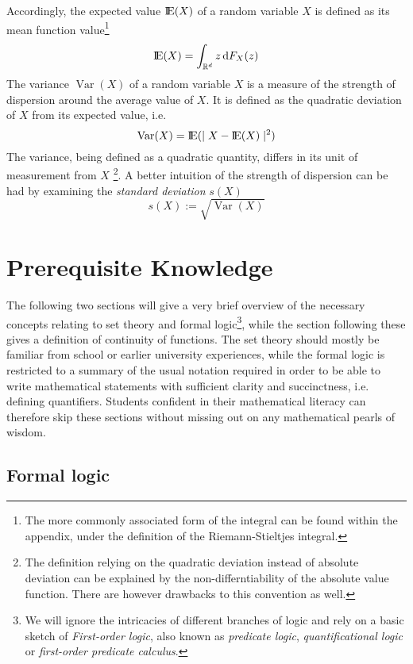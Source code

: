\documentclass[12pt]{article}
\newcommand*\diff{\mathop{}\!\mathrm{d}}
\newcommand{\E}{\mbox{I\negthinspace E}}
\DeclareMathOperator{\Var}{Var}
\begin{document}
Accordingly, the expected value $\E (X)$ of a random variable $X$ is defined as its mean function value\footnote{The more commonly associated form of the integral can be found within the appendix, under the definition of the Riemann-Stieltjes integral.}
\[
\E (X) = \int_{\mathbb{R}^d } z \diff F_X(z)
\]
The variance $\Var (X)$ of a random variable $X$ is a measure of the strength of dispersion around the average value of $X$. It is defined as the quadratic deviation of $X$ from its expected value, i.e.
\[
\Var (X) = \E (\mid X - \E (X) \mid ^2)
\]
The variance, being defined as a quadratic quantity, differs in its unit of measurement from $X$ \footnote{The definition relying on the quadratic deviation instead of absolute deviation can be explained by the non-differntiability of the absolute value function. There are however drawbacks to this convention as well.}. A better intuition of the strength of dispersion can be had by examining the \textit{standard deviation} $s(X)$
\[
s(X) := \sqrt{\Var (X)}
\]

\appendix

\section{Prerequisite Knowledge}
The following two sections will give a very brief overview of the necessary concepts relating to set theory and formal logic\footnote{We will ignore the intricacies of different branches of logic and rely on a basic sketch of\textit{ First-order logic}, also known as \textit{predicate logic}, \textit{quantificational logic} or \textit{first-order predicate calculus}.}, while the section following these gives a definition of continuity of functions. The set theory should mostly be familiar from school or earlier university experiences, while the formal logic is restricted to a summary of the usual notation required in order to be able to write mathematical statements with sufficient clarity and succinctness, i.e. defining quantifiers. Students confident in their mathematical literacy can therefore skip these sections without missing out on any mathematical pearls of wisdom.
\subsection{Formal logic}
\end{document}

